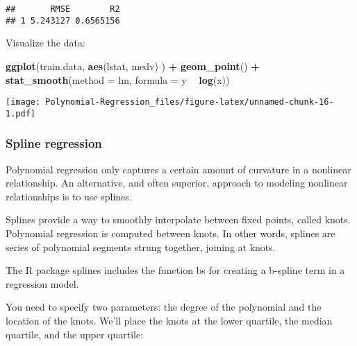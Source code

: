 \documentclass[]{article}
\newenvironment{Shaded}{\begin{snugshade}}{\end{snugshade}}
\newcommand{\DataTypeTok}[1]{\textcolor[rgb]{0.13,0.29,0.53}{#1}}
\newcommand{\FloatTok}[1]{\textcolor[rgb]{0.00,0.00,0.81}{#1}}
\newcommand{\KeywordTok}[1]{\textcolor[rgb]{0.13,0.29,0.53}{\textbf{#1}}}
\newcommand{\NormalTok}[1]{#1}
\newcommand{\OperatorTok}[1]{\textcolor[rgb]{0.81,0.36,0.00}{\textbf{#1}}}
\newcommand{\StringTok}[1]{\textcolor[rgb]{0.31,0.60,0.02}{#1}}
\begin{document}
\begin{verbatim}
##       RMSE        R2
## 1 5.243127 0.6565156
\end{verbatim}

Visualize the data:

\begin{Shaded}
\begin{Highlighting}[]
\KeywordTok{ggplot}\NormalTok{(train.data, }\KeywordTok{aes}\NormalTok{(lstat, medv) ) }\OperatorTok{+}
\StringTok{  }\KeywordTok{geom_point}\NormalTok{() }\OperatorTok{+}
\StringTok{  }\KeywordTok{stat_smooth}\NormalTok{(}\DataTypeTok{method =}\NormalTok{ lm, }\DataTypeTok{formula =}\NormalTok{ y }\OperatorTok{~}\StringTok{ }\KeywordTok{log}\NormalTok{(x))}
\end{Highlighting}
\end{Shaded}

\texttt{[image: Polynomial-Regression\_files/figure-latex/unnamed-chunk-16-1.pdf]}

\hypertarget{spline-regression}{%
\subsubsection{Spline regression}\label{spline-regression}}

Polynomial regression only captures a certain amount of curvature in a
nonlinear relationship. An alternative, and often superior, approach to
modeling nonlinear relationships is to use splines.

Splines provide a way to smoothly interpolate between fixed points,
called knots. Polynomial regression is computed between knots. In other
words, splines are series of polynomial segments strung together,
joining at knots.

The R package splines includes the function bs for creating a b-spline
term in a regression model.

You need to specify two parameters: the degree of the polynomial and the
location of the knots. We'll place the knots at the lower quartile, the
median quartile, and the upper quartile:

\begin{Shaded}
\end{Shaded}
\end{document}
